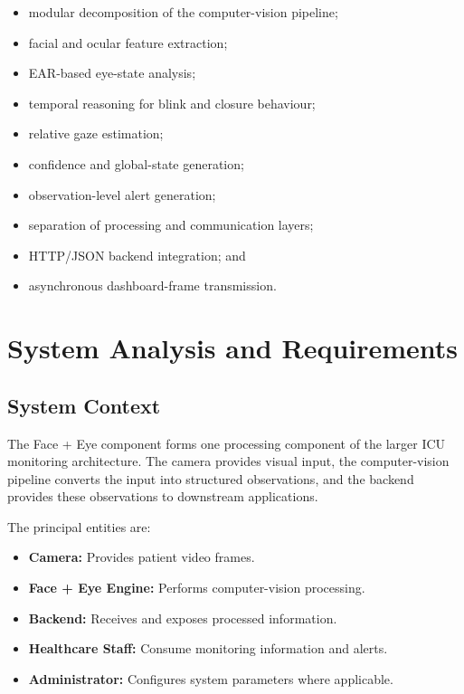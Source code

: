 \documentclass{tietreport}
\begin{document}
\begin{itemize}
    \item modular decomposition of the computer-vision pipeline;
    \item facial and ocular feature extraction;
    \item EAR-based eye-state analysis;
    \item temporal reasoning for blink and closure behaviour;
    \item relative gaze estimation;
    \item confidence and global-state generation;
    \item observation-level alert generation;
    \item separation of processing and communication layers;
    \item HTTP/JSON backend integration; and
    \item asynchronous dashboard-frame transmission.
\end{itemize}


\chapter{System Analysis and Requirements}

\section{System Context}

The Face + Eye component forms one processing component of the larger
ICU monitoring architecture. The camera provides visual input, the
computer-vision pipeline converts the input into structured
observations, and the backend provides these observations to downstream
applications.

The principal entities are:

\begin{itemize}
    \item \textbf{Camera:} Provides patient video frames.
    \item \textbf{Face + Eye Engine:} Performs computer-vision
    processing.
    \item \textbf{Backend:} Receives and exposes processed information.
    \item \textbf{Healthcare Staff:} Consume monitoring information
    and alerts.
    \item \textbf{Administrator:} Configures system parameters where
    applicable.
\end{itemize}
\end{document}
